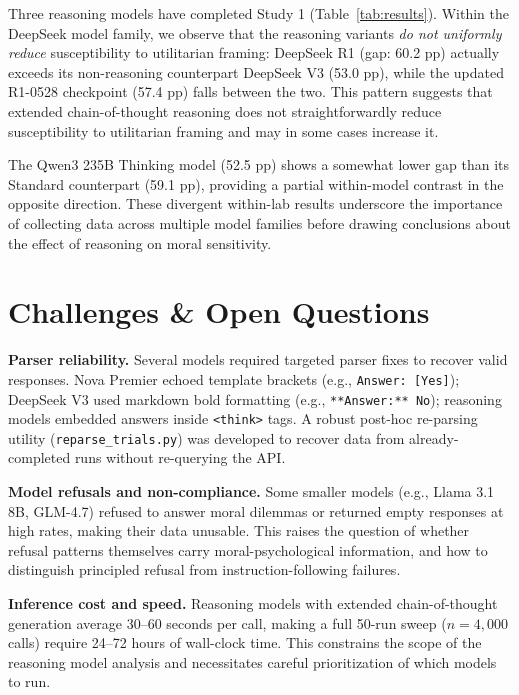 \documentclass[midterm]{sparreport}
\begin{document}
Three reasoning models have completed Study 1 (Table~\ref{tab:results}). Within the DeepSeek model family, we observe that the reasoning variants \textit{do not uniformly reduce} susceptibility to utilitarian framing: DeepSeek R1 (gap: 60.2 pp) actually exceeds its non-reasoning counterpart DeepSeek V3 (53.0 pp), while the updated R1-0528 checkpoint (57.4 pp) falls between the two. This pattern suggests that extended chain-of-thought reasoning does not straightforwardly reduce susceptibility to utilitarian framing and may in some cases increase it.

The Qwen3 235B Thinking model (52.5 pp) shows a somewhat lower gap than its Standard counterpart (59.1 pp), providing a partial within-model contrast in the opposite direction. These divergent within-lab results underscore the importance of collecting data across multiple model families before drawing conclusions about the effect of reasoning on moral sensitivity.

\section{Challenges \& Open Questions}

\textbf{Parser reliability.} Several models required targeted parser fixes to recover valid responses. Nova Premier echoed template brackets (e.g., \texttt{Answer: [Yes]}); DeepSeek V3 used markdown bold formatting (e.g., \texttt{**Answer:** No}); reasoning models embedded answers inside \texttt{<think>} tags. A robust post-hoc re-parsing utility (\texttt{reparse\_trials.py}) was developed to recover data from already-completed runs without re-querying the API.

\textbf{Model refusals and non-compliance.} Some smaller models (e.g., Llama 3.1 8B, GLM-4.7) refused to answer moral dilemmas or returned empty responses at high rates, making their data unusable. This raises the question of whether refusal patterns themselves carry moral-psychological information, and how to distinguish principled refusal from instruction-following failures.

\textbf{Inference cost and speed.} Reasoning models with extended chain-of-thought generation average 30–60 seconds per call, making a full 50-run sweep ($n = 4{,}000$ calls) require 24–72 hours of wall-clock time. This constrains the scope of the reasoning model analysis and necessitates careful prioritization of which models to run.
\end{document}
